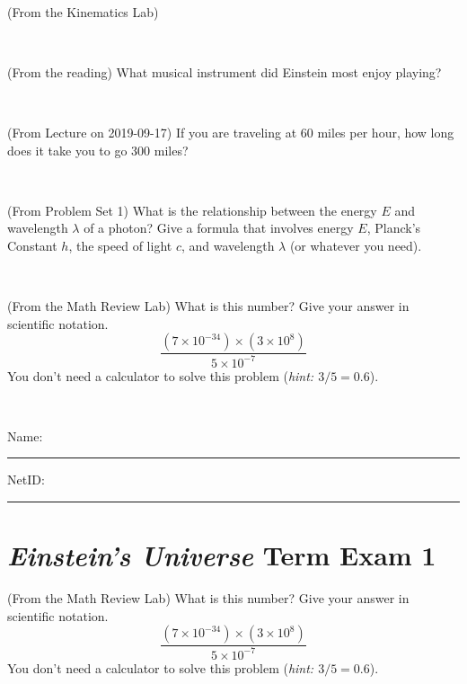 \documentclass[12pt, letterpaper]{article}
\begin{document}
\vfill ~

\begin{problem} (From the Kinematics Lab)

\end{problem}


\vfill ~


\clearpage


\begin{problem} (From the reading)
What musical instrument did Einstein most enjoy playing?
\end{problem}


\vfill ~

\begin{problem} (From Lecture on 2019-09-17)
If you are traveling at 60 miles per hour, how long does
it take you to go 300 miles?
\end{problem}


\vfill ~

\begin{problem} (From Problem Set 1)
What is the relationship between the energy $E$ and wavelength
$\lambda$ of a photon? Give a formula that involves energy $E$,
Planck's Constant $h$, the speed of light $c$, and wavelength
$\lambda$ (or whatever you need).
\end{problem}

\vfill ~

\begin{problem} (From the Math Review Lab)
What is this number? Give your answer in scientific notation.
$$
\frac{(7\times10^{-34})\times(3\times10^8)}{5\times10^{-7}}
$$
You don't need a calculator to solve this problem (\textit{hint: $3/5=0.6$}).
\end{problem}


\vfill ~


\cleardoublepage



\noindent
Name: \rule[-1ex]{0.60\textwidth}{0.1pt}
NetID: \rule[-1ex]{0.20\textwidth}{0.1pt}

\section*{\textsl{Einstein's Universe} Term Exam 1}
\setcounter{problem}{1}


\begin{problem} (From the Math Review Lab)
What is this number? Give your answer in scientific notation.
$$
\frac{(7\times10^{-34})\times(3\times10^8)}{5\times10^{-7}}
$$
You don't need a calculator to solve this problem (\textit{hint: $3/5=0.6$}).
\end{problem}
\end{document}
